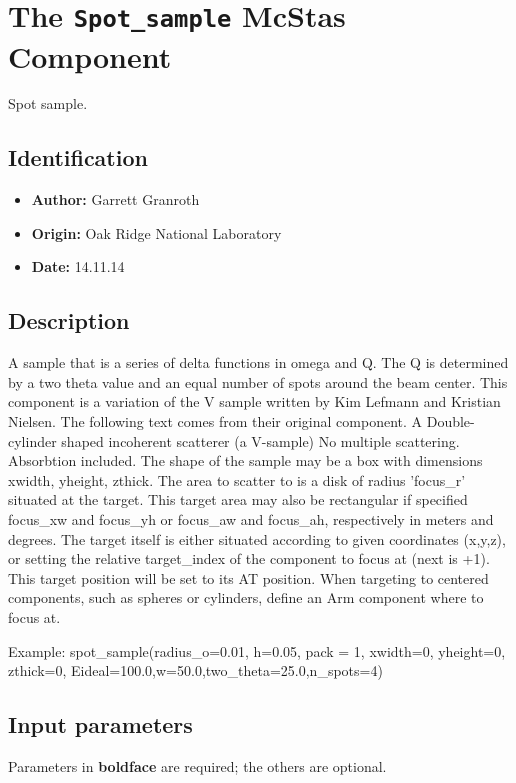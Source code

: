 \section{The \texttt{Spot\_sample} McStas Component}
Spot sample.

\subsection*{Identification}
\begin{itemize}
  \item \textbf{Author:} Garrett Granroth
  \item \textbf{Origin:} Oak Ridge National Laboratory
  \item \textbf{Date:} 14.11.14
\end{itemize}

\subsection*{Description}
A sample that is a series of delta functions in omega and Q. The Q is determined by a two theta value and an equal number of spots around the beam center. This component is a variation of the V sample written by Kim Lefmann and Kristian Nielsen. The following text comes from their original component. A Double-cylinder shaped incoherent scatterer (a V-sample) No multiple scattering. Absorbtion included. The shape of the sample may be a box with dimensions xwidth, yheight, zthick. The area to scatter to is a disk of radius 'focus\_r' situated at the target. This target area may also be rectangular if specified focus\_xw and focus\_yh or focus\_aw and focus\_ah, respectively in meters and degrees. The target itself is either situated according to given coordinates (x,y,z), or setting the relative target\_index of the component to focus at (next is +1). This target position will be set to its AT position. When targeting to centered components, such as spheres or cylinders, define an Arm component where to focus at.

Example: spot\_sample(radius\_o=0.01, h=0.05, pack = 1, xwidth=0, yheight=0, zthick=0, Eideal=100.0,w=50.0,two\_theta=25.0,n\_spots=4)

\subsection*{Input parameters}
Parameters in \textbf{boldface} are required; the others are optional.


